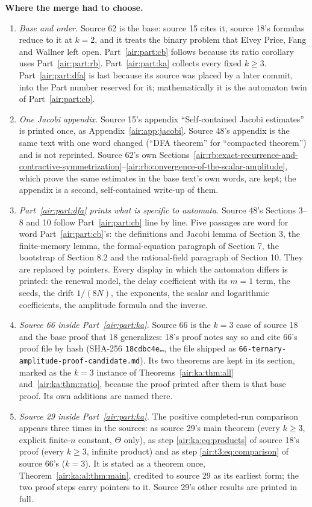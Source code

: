 \documentclass[11pt,letterpaper]{article}
\numberwithin{equation}{section}
\theoremstyle{remark}
\newcommand{\repopath}[1]{\nolinkurl{#1}}
\begin{document}
\textbf{Where the merge had to choose.}
\begin{enumerate}
\item \emph{Base and order.} Source 62 is the base: source 15 cites it, source 18's formulas reduce to it at $k=2$, and it treats the binary problem that Elvey Price, Fang and Wallner left open. Part~\ref{air:part:cb} follows because its ratio corollary uses Part~\ref{air:part:rb}. Part~\ref{air:part:ka} collects every fixed $k\ge3$. Part~\ref{air:part:dfa} is last because its source was placed by a later commit, into the Part number reserved for it; mathematically it is the automaton twin of Part~\ref{air:part:cb}.
\item \emph{One Jacobi appendix.} Source 15's appendix ``Self-contained Jacobi estimates'' is printed once, as Appendix~\ref{air:app:jacobi}. Source 48's appendix is the same text with one word changed (``DFA theorem'' for ``compacted theorem'') and is not reprinted. Source 62's own Sections~\ref{air:rb:exact-recurrence-and-contractive-symmetrization}--\ref{air:rb:convergence-of-the-scalar-amplitude}, which prove the same estimates in the base text's own words, are kept; the appendix is a second, self-contained write-up of them.
\item \emph{Part~\ref{air:part:dfa} prints what is specific to automata.} Source 48's Sections 3--8 and 10 follow Part~\ref{air:part:cb} line by line. Five passages are word for word Part~\ref{air:part:cb}'s: the definitions and Jacobi lemma of Section 3, the finite-memory lemma, the formal-equation paragraph of Section 7, the bootstrap of Section 8.2 and the rational-field paragraph of Section 10. They are replaced by pointers. Every display in which the automaton differs is printed: the renewal model, the delay coefficient with its $m=1$ term, the seeds, the drift $1/(8N)$, the exponents, the scalar and logarithmic coefficients, the amplitude formula and the inverse.
\item \emph{Source 66 inside Part~\ref{air:part:ka}.} Source 66 is the $k=3$ case of source 18 and the base proof that 18 generalizes: 18's proof notes say so and cite 66's proof file by hash (SHA-256 \texttt{18cdbc4e\ldots}, the file shipped as \repopath{66-ternary-amplitude-proof-candidate.md}). Its two theorems are kept in its section, marked as the $k=3$ instance of Theorems~\ref{air:ka:thm:all} and~\ref{air:ka:thm:ratio}, because the proof printed after them is that base proof. Its own additions are named there.
\item \emph{Source 29 inside Part~\ref{air:part:ka}.} The positive completed-run comparison appears three times in the sources: as source 29's main theorem (every $k\ge3$, explicit finite-$n$ constant, $\Theta$ only), as step \eqref{air:ka:eq:products} of source 18's proof (every $k\ge3$, infinite product) and as step \eqref{air:t3:eq:comparison} of source 66's ($k=3$). It is stated as a theorem once, Theorem~\ref{air:ka:al:thm:main}, credited to source 29 as its earliest form; the two proof steps carry pointers to it. Source 29's other results are printed in full.

\end{enumerate}
\end{document}
